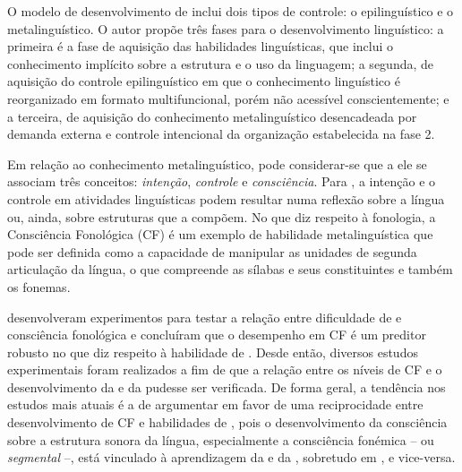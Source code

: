 \documentclass[output=paper]{LSP/langsci}
\begin{document}
O modelo de desenvolvimento de \citet{gombert1992,gombert2003} inclui dois tipos de controle: o epilinguístico e o metalinguístico. O autor propõe três fases para o desenvolvimento linguístico: a primeira é a fase de aquisição das habilidades linguísticas, que inclui o conhecimento implícito sobre a estrutura e o uso da linguagem; a segunda, de aquisição do controle epilinguístico em que o conhecimento linguístico é reorganizado em formato multifuncional, porém não acessível conscientemente; e a terceira, de aquisição do conhecimento metalinguístico desencadeada por demanda externa e controle intencional da organização estabelecida na fase 2.

Em relação ao conhecimento metalinguístico, pode considerar-se que a ele se associam três conceitos: \textit{intenção}, \textit{controle} e \textit{consciência}. Para \citet[42]{cardosomartins1991}, a intenção e o controle em atividades linguísticas podem resultar numa reflexão sobre a língua ou, ainda, sobre estruturas que a compõem. No que diz respeito à fonologia, a Consciência Fonológica (CF) é um exemplo de habilidade metalinguística que pode ser definida como a capacidade de manipular as unidades de segunda articulação da língua, o que compreende as sílabas e seus constituintes e também os fonemas.

\citet{bradley1978} desenvolveram experimentos para testar a relação entre dificuldade de  e consciência fonológica e concluíram que o desempenho em CF é um preditor robusto no que diz respeito à habilidade de . Desde então, diversos estudos experimentais foram realizados a fim de que a relação entre os níveis de CF e o desenvolvimento da  e da  pudesse ser verificada. De forma geral, a tendência nos estudos mais atuais é a de argumentar em favor de uma reciprocidade entre desenvolvimento de CF e habilidades de , pois o desenvolvimento da consciência sobre a estrutura sonora da língua, especialmente a consciência fonémica -- ou \textit{segmental} --, está vinculado à aprendizagem da  e da , sobretudo em , e vice-versa.
\end{document}
